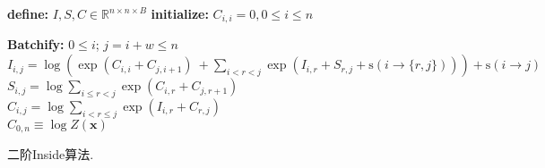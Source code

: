 \begin{algorithm}[tb]
    \begin{algorithmic}[1]
        \newlength{\commentindent}
        \setlength{\commentindent}{.3\textwidth}
        \renewcommand{\algorithmiccomment}[1]{\unskip\hfill\makebox[\commentindent][l]{$\rhd$~#1}\par}
        \LetLtxMacro{\oldalgorithmic}{\algorithmic}
        \renewcommand{\algorithmic}[1][0]{
            \oldalgorithmic[#1]
            \renewcommand{\ALC@com}[1]{
                \ifnum\pdfstrcmp{##1}{default}=0\else\algorithmiccomment{##1}\fi}%
        }
        \STATE \textbf{define:} $I,S,C \in \mathbb{R}^{n \times n \times B}$ 
        \STATE \textbf{initialize:} $C_{i, i}  = 0, 0 \le i \le n$

        \STATE \textbf{Batchify:} $0 \le i$; $j=i+w \le n$
        \STATE $I_{i, j} = \log\left(\exp\left(C_{i, i}  +  C_{j, i+1}\right) ~ +\sum\limits_{i < r < j} \exp\left(I_{i, r} + S_{r, j}+ \mathrm{s}(i\rightarrow \{r,j\})\right)\right) + \mathrm{s}(i\rightarrow j)$
        \STATE $S_{i, j} = \log \sum\limits_{i \le r < j} \exp\left(C_{i, r}  +  C_{j, r+1}\right) $ \\
        \STATE $C_{i, j} = \log \sum\limits_{i < r \le j} \exp\left(I_{i, r}  +  C_{r, j}\right)  $ \\
        \ENDFOR {}
        \RETURN $C_{0, n} \equiv \log Z(\boldsymbol{x})$
    \end{algorithmic}
    \caption{二阶Inside算法.}
    \label{alg:eisner-2o}
\end{algorithm}
